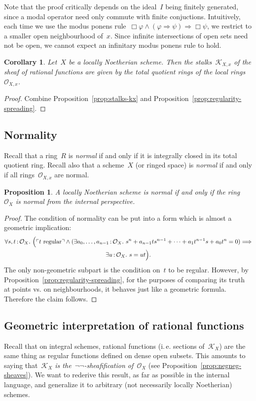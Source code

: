 \documentclass[10pt]{amsart}
\makeatletter
\theoremstyle{definition}
\theoremstyle{plain}
\newtheorem{prop}[defn]{Proposition}
\newtheorem{cor}[defn]{Corollary}
\theoremstyle{remark}
\renewcommand{\O}{\mathcal{O}}
\newcommand{\K}{\mathcal{K}}
\newcommand{\?}{\,{:}\,}
\renewcommand{\_}{\mathpunct{.}\,}
\newcommand{\speak}[1]{\ulcorner\text{\textnormal{#1}}\urcorner}
\newcommand{\ie}{i.\,e.\@\xspace}
\newcommand{\vs}{vs.\@\xspace}
\makeatother
\begin{document}
Note that the proof critically depends on the ideal~$I$ being finitely
generated, since a modal operator need only commute with finite
conjuctions. Intuitively, each time we use the modus ponens rule~$\Box\varphi \wedge
(\varphi \Rightarrow \psi) \Rightarrow \Box\psi$, we restrict to a smaller open
neighbourhood of~$x$. Since infinite intersections of open sets need not be
open, we cannot expect an infinitary modus ponens rule to hold.

\begin{cor}Let~$X$ be a locally Noetherian scheme. Then the stalks~$\K_{X,x}$
of the sheaf of rational functions are given by the total quotient rings of the
local rings~$\O_{X,x}$.\end{cor}
\begin{proof}Combine Proposition~\ref{prop:stalks-kx} and
Proposition~\ref{prop:regularity-spreading}.\end{proof}


\subsection{Normality}\label{sect:normality}
Recall that a ring~$R$ is \emph{normal} if and only if
it is integrally closed in its total quotient ring. Recall also that a
scheme~$X$ (or ringed space) is \emph{normal} if and only if all
rings~$\O_{X,x}$ are normal.

\begin{prop}A locally Noetherian scheme is normal if and only if the
ring~$\O_X$ is normal from the internal perspective.\end{prop}
\begin{proof}The condition of normality can be put into a form which is almost
a geometric implication:
\begin{multline*}
  \forall s,t\?\O_X\_
  \Bigl(\speak{$t$ regular} \wedge
  (\exists a_0,\ldots,a_{n-1}\?\O_X\_
  s^n + a_{n-1} t s^{n-1} + \cdots + a_1 t^{n-1} s + a_0 t^n = 0)
  \Longrightarrow \\
  \exists u\?\O_X\_ s = ut\Bigr).
\end{multline*}
The only non-geometric subpart is the condition on~$t$ to be regular. However,
by Proposition~\ref{prop:regularity-spreading}, for the purposes of comparing
its truth at points \vs on neighbourhoods, it behaves just like a geometric
formula. Therefore the claim follows.
\end{proof}


\subsection{Geometric interpretation of rational functions} Recall that on
integral schemes, rational functions (\ie sections of~$\K_X$) are the same
thing as regular functions defined on dense open subsets. This amounts to
saying that~\emph{$\K_X$ is the~$\neg\neg$-sheafification of~$\O_X$}
(see Proposition~\ref{prop:negneg-sheaves}). We want to rederive this result,
as far as possible in the internal language, and generalize it to arbitrary
(not necessarily locally Noetherian) schemes.
\end{document}
